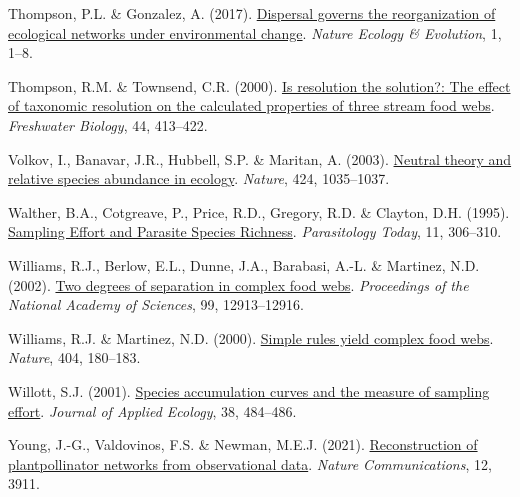 \documentclass[10pt,oneside]{article}
\newlength{\cslhangindent}
\newenvironment{CSLReferences}[3] %
 {%
  \setlength{\parindent}{0pt}
  \ifodd #1 \everypar{\setlength{\hangindent}{\cslhangindent}}\ignorespaces\fi
  \ifnum #2 > 0
  \setlength{\parskip}{#2\baselineskip}
  \fi
 }%
 {}
\begin{document}
\begin{CSLReferences}{1}{0}
\leavevmode{}%
Thompson, P.L. \& Gonzalez, A. (2017).
\href{https://doi.org/10.1038/s41559-017-0162}{Dispersal governs the
reorganization of ecological networks under environmental change}.
\emph{Nature Ecology \& Evolution}, 1, 1--8.

\leavevmode{}%
Thompson, R.M. \& Townsend, C.R. (2000).
\href{https://doi.org/10.1046/j.1365-2427.2000.00579.x}{Is resolution
the solution?: The effect of taxonomic resolution on the calculated
properties of three stream food webs}. \emph{Freshwater Biology}, 44,
413--422.

\leavevmode{}%
Volkov, I., Banavar, J.R., Hubbell, S.P. \& Maritan, A. (2003).
\href{https://doi.org/10.1038/nature01883}{Neutral theory and relative
species abundance in ecology}. \emph{Nature}, 424, 1035--1037.

\leavevmode{}%
Walther, B.A., Cotgreave, P., Price, R.D., Gregory, R.D. \& Clayton,
D.H. (1995).
\href{https://doi.org/10.1016/0169-4758(95)80047-6}{Sampling Effort and
Parasite Species Richness}. \emph{Parasitology Today}, 11, 306--310.

\leavevmode{}%
Williams, R.J., Berlow, E.L., Dunne, J.A., Barabasi, A.-L. \& Martinez,
N.D. (2002). \href{https://doi.org/10.1073/pnas.192448799}{Two degrees
of separation in complex food webs}. \emph{Proceedings of the National
Academy of Sciences}, 99, 12913--12916.

\leavevmode{}%
Williams, R.J. \& Martinez, N.D. (2000).
\href{https://doi.org/10.1038/35004572}{Simple rules yield complex food
webs}. \emph{Nature}, 404, 180--183.

\leavevmode{}%
Willott, S.J. (2001).
\href{https://doi.org/10.1046/j.1365-2664.2001.00589.x}{Species
accumulation curves and the measure of sampling effort}. \emph{Journal
of Applied Ecology}, 38, 484--486.

\leavevmode{}%
Young, J.-G., Valdovinos, F.S. \& Newman, M.E.J. (2021).
\href{https://doi.org/10.1038/s41467-021-24149-x}{Reconstruction of
plantpollinator networks from observational data}. \emph{Nature
Communications}, 12, 3911.

\end{CSLReferences}
\end{document}
